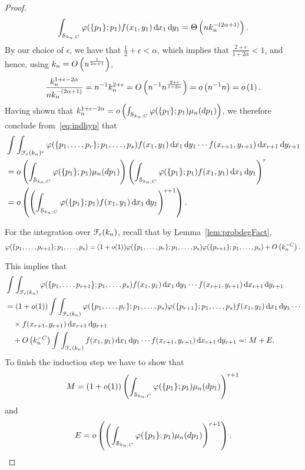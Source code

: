 \begin{proof}
\begin{align*}
\int_{\mathcal{S}_{k_n,C}} \varphi(\{p_1\};p_1) f(x_1,y_1) \operatorname{\mathrm{d}\hspace{-2pt}} x_1 \operatorname{\mathrm{d}\hspace{-2pt}} y_1 = \Theta\left(n k_n^{-(2\alpha+1)}\right).
\end{align*}
By our choice of $\epsilon$, we have that $\frac{1}{2}+\epsilon<\alpha$, which implies that $\frac{2+\epsilon}{1+2\alpha}<1$, and hence, using $k_n = O\left(n^{\frac{1}{2\alpha+1}}\right)$,
\begin{align*}
\frac{k_n^{1+\epsilon-2\alpha}}{nk_n^{-(2\alpha+1)}} = n^{-1} k_n^{2+\epsilon} = O\left(n^{-1} n^{\frac{2+\epsilon}{1+2\alpha}}\right) = o\left(n^{-1}n\right)= o\left(1\right).
\end{align*}
Having shown that $k_n^{1+\epsilon-2\alpha} = o\left(\int_{\mathcal{S}_{k_n,C}} \varphi(\{p_1\};p_1)\mu_n(dp_1)\right)$, we therefore conclude from~\eqref{eq:indhyp} that
\begin{align*}
	&\int \int_{\mathcal{F}_\epsilon(k_n)^c} \varphi(\{p_1,\dots,p_r\};p_1,\dots,p_s)
		f(x_1,y_1) \operatorname{\mathrm{d}\hspace{-2pt}} x_1 \operatorname{\mathrm{d}\hspace{-2pt}} y_1 \cdots f(x_{r+1},y_{r+1})\operatorname{\mathrm{d}\hspace{-2pt}} x_{r+1} \operatorname{\mathrm{d}\hspace{-2pt}} y_{r+1}\\
	&=o\left(\int_{\mathcal{S}_{k_n,C}} \varphi(\{p_1\};p_1)\mu_n(dp_1)\right)\left(\int_{\mathcal{S}_{k_n,C}} \varphi(\{p_1\};p_1) 
		f(x_1,y_1) \operatorname{\mathrm{d}\hspace{-2pt}} x_1 \operatorname{\mathrm{d}\hspace{-2pt}} y_1\right)^r  \\
	&=o\left(\left(\int_{\mathcal{S}_{k_n,C}} \varphi(\{p_1\};p_1)f(x_1,y_1) \operatorname{\mathrm{d}\hspace{-2pt}} x_1 \operatorname{\mathrm{d}\hspace{-2pt}} y_1\right)^{r+1}\right).
\end{align*}

For the integration over $\mathcal{F}_\epsilon(k_n)$, recall that by Lemma~\ref{lem:probdegFact}, $$\varphi(\{p_1,\dots,p_{r+1}\};p_1,\dots,p_s)=(1+o(1))\varphi(\{p_1,\dots,p_r\};p_1,\dots,p_s)\varphi(\{p_{r+1}\};p_1,\dots,p_s)+O\left(k_n^{-C}\right).$$%

This implies that
\begin{align*}
	&\int \int_{\Fcal_\epsilon(k_n)} \varphi(\{p_1,\dots,p_{r+1}\};p_1,\dots,p_s) 
		 f(x_1,y_1) \dd x_1 \dd y_1 \cdots f(x_{r+1},y_{r+1})\dd x_{r+1} \dd y_{r+1}\\
	&=(1+o(1))\int \int_{\Fcal_\epsilon(k_n)} \varphi(\{p_1,\dots,p_r\};p_1,\dots,p_s) 
		\varphi(\{p_{r+1}\};p_1,\dots,p_s) f(x_1,y_1) \dd x_1 \dd y_1 \cdots \\
	&\hspace{10pt} \times f(x_{r+1},y_{r+1})\dd x_{r+1} \dd y_{r+1}\\
	&\hspace{10pt}+\bigO{k_n^{-C}}\int \int_{\Fcal_\epsilon(k_n)} 
		f(x_1,y_1) \dd x_1 \dd y_1 \cdots f(x_{r+1},y_{r+1})\dd x_{r+1} \dd y_{r+1} =:M+E.
\end{align*}
To finish the induction step we have to show that
\begin{align*}
M=(1+o(1)) \left(\int_{\mathcal{S}_{k_n,C}} \varphi(\{p_1\};p_1)\mu_n(dp_1)\right)^{r+1}
\end{align*}
and
\begin{align*}
E=o\left(\left(\int_{\mathcal{S}_{k_n,C}} \varphi(\{p_1\};p_1)\mu_n(dp_1)\right)^{r+1}\right).
\end{align*}


\end{proof}
